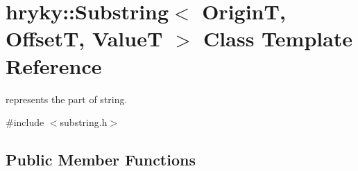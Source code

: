 \hypertarget{classhryky_1_1_substring}{\section{hryky\-:\-:Substring$<$ Origin\-T, Offset\-T, Value\-T $>$ Class Template Reference}
\label{classhryky_1_1_substring}
}


represents the part of string.  




{\ttfamily \#include $<$substring.\-h$>$}

\subsection*{Public Member Functions}
